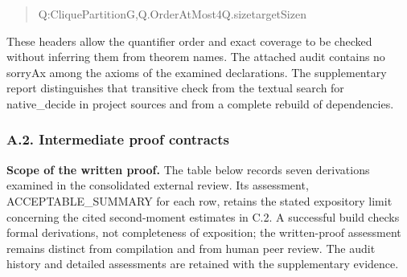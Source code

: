\documentclass[english,11pt,a4paper]{article}
\newlength{\LeanCharWidth}
\begin{document}
\begin{quote}
\noindent \hspace*{\dimexpr 8\LeanCharWidth\relax}{\LeanSymbols ∃}\hspace*{\dimexpr 1\LeanCharWidth\relax}Q\hspace*{\dimexpr 1\LeanCharWidth\relax}:\hspace*{\dimexpr 1\LeanCharWidth\relax}CliquePartition\hspace*{\dimexpr 1\LeanCharWidth\relax}G,\hspace*{\dimexpr 1\LeanCharWidth\relax}Q.OrderAtMost\hspace*{\dimexpr 1\LeanCharWidth\relax}4\hspace*{\dimexpr 1\LeanCharWidth\relax}{\LeanSymbols ∧}\hspace*{\dimexpr 1\LeanCharWidth\relax}Q.size\hspace*{\dimexpr 1\LeanCharWidth\relax}{\LeanSymbols ≤}\hspace*{\dimexpr 1\LeanCharWidth\relax}targetSize\hspace*{\dimexpr 1\LeanCharWidth\relax}n\par
\end{quote}

These headers allow the quantifier order and exact coverage to be checked without inferring them from theorem names. The attached audit contains no {\ttfamily\small sorryAx} among the axioms of the examined declarations. The supplementary report distinguishes that transitive check from the textual search for {\ttfamily\small native\_\discretionary{\hbox{\ensuremath{\hookrightarrow}}}{}{}decide} in project sources and from a complete rebuild of dependencies.

\subsubsection{A.2. Intermediate proof contracts}\label{a.2.-intermediate-proof-contracts}

\textbf{Scope of the written proof.} The table below records seven derivations examined in the consolidated external review. Its assessment, ACCEPTABLE\_SUMMARY for each row, retains the stated expository limit concerning the cited second-moment estimates in C.2. A successful build checks formal derivations, not completeness of exposition; the written-proof assessment remains distinct from compilation and from human peer review. The audit history and detailed assessments are retained with the supplementary evidence.

\end{document}
